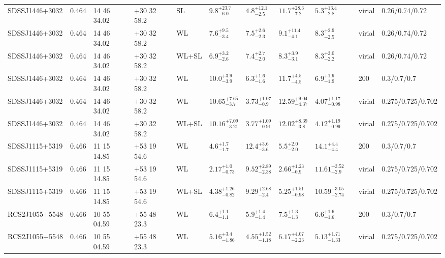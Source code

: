 \begin{landscape}
\begin{center}
{\begin{longtable}{llllllllllll}
SDSSJ1446+3032 & 0.464 & 14 46 34.02 & +30 32 58.2 & SL & ${9.8}^{+23.7}_{-6.0}$ & ${4.8}^{+12.1}_{-2.5}$ & ${11.7}^{+28.3}_{-7.2}$ & ${5.3}^{+13.4}_{-2.8}$ & \citet{OG09.1} & virial & 0.26/0.74/0.72 \\
SDSSJ1446+3032 & 0.464 & 14 46 34.02 & +30 32 58.2 & WL & ${7.6}^{+9.5}_{-3.4}$ & ${7.5}^{+2.6}_{-2.3}$ & ${9.1}^{+11.4}_{-4.1}$ & ${8.3}^{+2.9}_{-2.5}$ & \citet{OG09.1} & virial & 0.26/0.74/0.72 \\
SDSSJ1446+3032 & 0.464 & 14 46 34.02 & +30 32 58.2 & WL+SL & ${6.9}^{+3.2}_{-2.6}$ & ${7.4}^{+2.7}_{-2.0}$ & ${8.3}^{+3.9}_{-3.1}$ & ${8.3}^{+3.0}_{-2.2}$ & \citet{OG09.1} & virial & 0.26/0.74/0.72 \\
SDSSJ1446+3032 & 0.464 & 14 46 34.02 & +30 32 58.2 & WL & ${10.0}^{+3.9}_{-3.9}$ & ${6.3}^{+1.6}_{-1.6}$ & ${11.7}^{+4.5}_{-4.5}$ & ${6.9}^{+1.9}_{-1.9}$ & \citet{SE14.1} & 200 & 0.3/0.7/0.7 \\
SDSSJ1446+3032 & 0.464 & 14 46 34.02 & +30 32 58.2 & WL & ${10.65}^{+7.65}_{-3.7}$ & ${3.73}^{+1.07}_{-0.9}$ & ${12.59}^{+9.04}_{-4.37}$ & ${4.07}^{+1.17}_{-0.98}$ & \citet{OG12.1} & virial & 0.275/0.725/0.702 \\
SDSSJ1446+3032 & 0.464 & 14 46 34.02 & +30 32 58.2 & WL+SL & ${10.16}^{+7.09}_{-3.21}$ & ${3.77}^{+1.09}_{-0.91}$ & ${12.02}^{+8.39}_{-3.8}$ & ${4.12}^{+1.19}_{-0.99}$ & \citet{OG12.1} & virial & 0.275/0.725/0.702 \\
SDSSJ1115+5319 & 0.466 & 11 15 14.85 & +53 19 54.6 & WL & ${4.6}^{+1.7}_{-1.7}$ & ${12.4}^{+3.6}_{-3.6}$ & ${5.5}^{+2.0}_{-2.0}$ & ${14.1}^{+4.4}_{-4.4}$ & \citet{SE14.1} & 200 & 0.3/0.7/0.7 \\
SDSSJ1115+5319 & 0.466 & 11 15 14.85 & +53 19 54.6 & WL & ${2.17}^{+1.0}_{-0.73}$ & ${9.52}^{+2.89}_{-2.38}$ & ${2.66}^{+1.23}_{-0.9}$ & ${11.61}^{+3.52}_{-2.9}$ & \citet{OG12.1} & virial & 0.275/0.725/0.702 \\
SDSSJ1115+5319 & 0.466 & 11 15 14.85 & +53 19 54.6 & WL+SL & ${4.38}^{+1.26}_{-0.82}$ & ${9.29}^{+2.68}_{-2.4}$ & ${5.25}^{+1.51}_{-0.98}$ & ${10.59}^{+3.05}_{-2.74}$ & \citet{OG12.1} & virial & 0.275/0.725/0.702 \\
RCS2J1055+5548 & 0.466 & 10 55 04.59 & +55 48 23.3 & WL & ${6.4}^{+1.1}_{-1.1}$ & ${5.9}^{+1.4}_{-1.4}$ & ${7.5}^{+1.3}_{-1.3}$ & ${6.6}^{+1.6}_{-1.6}$ & \citet{SE14.1} & 200 & 0.3/0.7/0.7 \\
RCS2J1055+5548 & 0.466 & 10 55 04.59 & +55 48 23.3 & WL & ${5.16}^{+3.4}_{-1.86}$ & ${4.55}^{+1.52}_{-1.18}$ & ${6.17}^{+4.07}_{-2.23}$ & ${5.13}^{+1.71}_{-1.33}$ & \citet{OG12.1} & virial & 0.275/0.725/0.702 \\

\end{longtable}}
\end{center}
\end{landscape}
